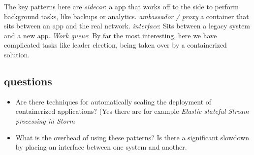 The key patterns here are \textit{sidecar}: a app that works off  to the side
to perform background tasks, like backups or analytics. \textit{ambassador /
proxy} a container that sits between an app and the real network.
\textit{interface}: Sits between a legacy system and a new app. \textit{Work
queue}: By far the most interesting, here we have complicated tasks like leader
election, being taken over by a containerized solution.


\subsection{questions}

\begin{itemize}

\item Are there techniques for automatically scaling the deployment of
containerized applications? (Yes there are for example \textit{Elastic stateful Stream processing in Storm}

\item What is the overhead of using these patterns? Is there a significant
slowdown by placing an interface between one system and another.

\end{itemize}

